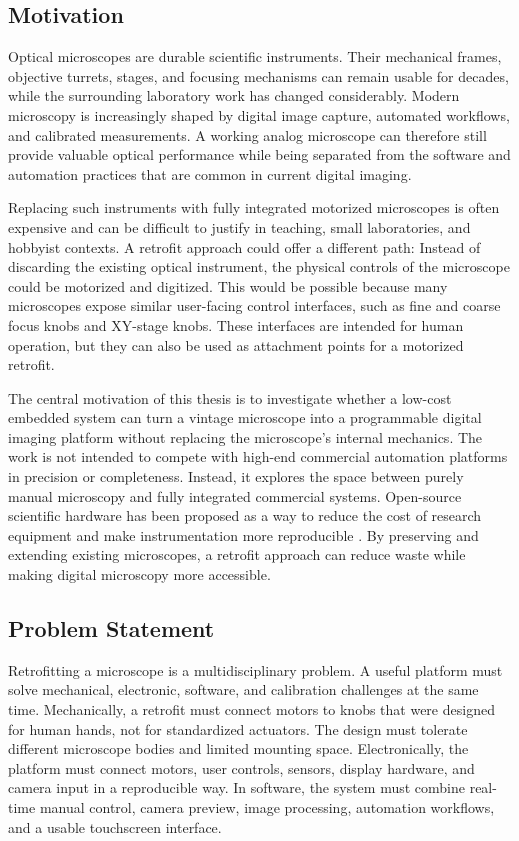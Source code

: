 \subsection{Motivation}

Optical microscopes are durable scientific instruments. Their mechanical frames, objective turrets, stages, and focusing mechanisms can remain usable for decades, while the surrounding laboratory work has changed considerably. Modern microscopy is increasingly shaped by digital image capture, automated workflows, and calibrated measurements. A working analog microscope can therefore still provide valuable optical performance while being separated from the software and automation practices that are common in current digital imaging.

Replacing such instruments with fully integrated motorized microscopes is often expensive and can be difficult to justify in teaching, small laboratories, and hobbyist contexts. A retrofit approach could offer a different path: Instead of discarding the existing optical instrument, the physical controls of the microscope could be motorized and digitized. This would be possible because many microscopes expose similar user-facing control interfaces, such as fine and coarse focus knobs and XY-stage knobs. These interfaces are intended for human operation, but they can also be used as attachment points for a motorized retrofit.

The central motivation of this thesis is to investigate whether a low-cost embedded system can turn a vintage microscope into a programmable digital imaging platform without replacing the microscope's internal mechanics. The work is not intended to compete with high-end commercial automation platforms in precision or completeness. Instead, it explores the space between purely manual microscopy and fully integrated commercial systems. Open-source scientific hardware has been proposed as a way to reduce the cost of research equipment and make instrumentation more reproducible \cite{pearce2012openhardware}. By preserving and extending existing microscopes, a retrofit approach can reduce waste while making digital microscopy more accessible.

\subsection{Problem Statement}

Retrofitting a microscope is a multidisciplinary problem. A useful platform must solve mechanical, electronic, software, and calibration challenges at the same time. Mechanically, a retrofit must connect motors to knobs that were designed for human hands, not for standardized actuators. The design must tolerate different microscope bodies and limited mounting space. Electronically, the platform must connect motors, user controls, sensors, display hardware, and camera input in a reproducible way. In software, the system must combine real-time manual control, camera preview, image processing, automation workflows, and a usable touchscreen interface.

